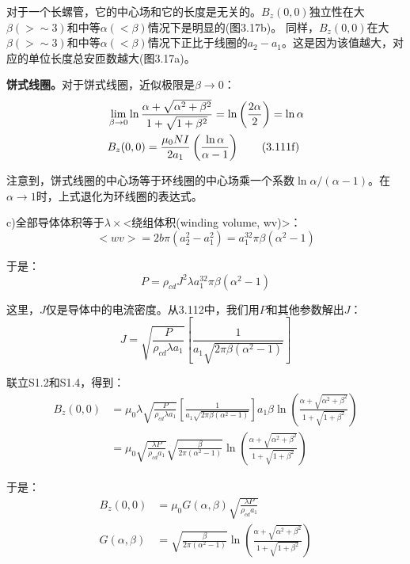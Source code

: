 对于一个长螺管，它的中心场和它的长度是无关的。$B_z(0,0)$独立性在大$\beta(>\sim 3)$和中等$\alpha(<\beta)$情况下是明显的(图3.17b)。
同样，$B_z(0,0)$在大$\beta(>\sim 3)$和中等$\alpha(<\beta)$情况下正比于线圈的$a_2-a_1$。这是因为该值越大，对应的单位长度总安匝数越大(图3.17a)。

\textbf{饼式线圈。}对于饼式线圈，近似极限是$\beta\rightarrow 0$：
\begin{align*}
&\lim_{\beta\rightarrow 0}\ln\frac{\alpha+\sqrt{\alpha^2+\beta^2}}{1+\sqrt{1+\beta^2}}=\ln\left(\frac{2\alpha}{2}\right)=\ln\alpha\notag \\%
&B_z(0,0)=\frac{\mu_0NI}{2a_1}\left(\frac{\ln\alpha}{\alpha-1}\right) \tag{3.111f}%
\end{align*}

注意到，饼式线圈的中心场等于环线圈的中心场乘一个系数$\ln \alpha/(\alpha-1)$。在$\alpha\rightarrow 1$时，上式退化为环线圈的表达式。

c)全部导体体积等于$\lambda\times$<绕组体积(winding volume, wv)>：
\begin{equation*}
<wv>=2b\pi(a_2^2-a_1^2)=a_1^32\pi\beta(\alpha^2-1)%
\end{equation*}

于是：
\begin{equation*}
P=\rho_{cd}J^2\lambda a_1^32\pi\beta(\alpha^2-1) \tag{3.112}%
\end{equation*}

这里，$J$仅是导体中的电流密度。从3.112中，我们用$P$和其他参数解出$J$：
\begin{equation*}
J=\sqrt{\frac{P}{\rho_{cd}\lambda a_1}}\left[\frac{1}{a_1\sqrt{2\pi\beta(\alpha^2-1)}}\right]\tag{S1.4}%
\end{equation*}

联立S1.2和S1.4，得到：
\begin{equation*}
\begin{split}
B_z(0,0)&=\mu_0\lambda\sqrt{\frac{P}{\rho_{cd}\lambda a_1}}\left[\frac{1}{a_1\sqrt{2\pi\beta(\alpha^2-1)}}\right]a_1\beta\ln(\frac{\alpha+\sqrt{\alpha^2+\beta^2}}{1+\sqrt{1+\beta^2}})\\
&=\mu_0\sqrt{\frac{\lambda P}{\rho_{cd}a_1}}\sqrt{\frac{\beta}{2\pi(\alpha^2-1)}}\ln\left(\frac{\alpha+\sqrt{\alpha^2+\beta^2}}{1+\sqrt{1+\beta^2}}\right)%
\end{split}
\end{equation*}

于是：
\begin{subequations}
\begin{align}
B_z(0,0)&=\mu_0G(\alpha,\beta)\sqrt{\frac{\lambda P}{\rho_{cd}a_1}}\\ %
G(\alpha,\beta)&=\sqrt{\frac{\beta}{2\pi(\alpha^2-1)}}\ln\left(\frac{\alpha+\sqrt{\alpha^2+\beta^2}}{1+\sqrt{1+\beta^2}}\right)%
\end{align}
\end{subequations}

